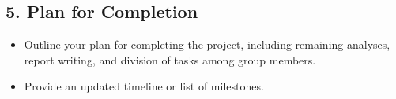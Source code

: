 \documentclass[12pt]{article}
\begin{document}
\subsection*{5. Plan for Completion}
\begin{itemize}
    \item Outline your plan for completing the project, including remaining analyses, report writing, and division of tasks among group members.
    \item Provide an updated timeline or list of milestones.
\end{itemize}
\end{document}
